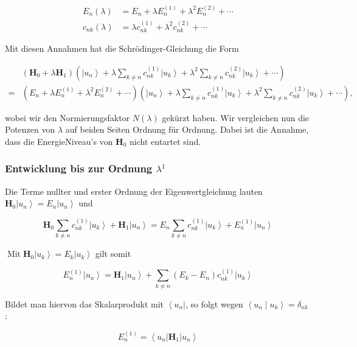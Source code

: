 \documentclass[10pt, letterpaper]{article}
\begin{document}
$$
\begin{aligned}
E_{n}(\lambda) & =E_{n}+\lambda E_{n}^{(1)}+\lambda^{2} E_{n}^{(2)}+\cdots \\
c_{n k}(\lambda) & =\lambda c_{n k}^{(1)}+\lambda^{2} c_{n k}^{(2)}+\cdots
\end{aligned}
$$

Mit diesen Annahmen hat die Schrödinger-Gleichung die Form

$$
\begin{aligned}
& \left(\mathbf{H}_{0}+\lambda \mathbf{H}_{1}\right)\left(\left|u_{n}\right\rangle+\lambda \sum_{k \neq n} c_{n k}^{(1)}\left|u_{k}\right\rangle+\lambda^{2} \sum_{k \neq n} c_{n k}^{(2)}\left|u_{k}\right\rangle+\cdots\right) \\
= & \left(E_{n}+\lambda E_{n}^{(1)}+\lambda^{2} E_{n}^{(2)}+\cdots\right)\left(\left|u_{n}\right\rangle+\lambda \sum_{k \neq n} c_{n k}^{(1)}\left|u_{k}\right\rangle+\lambda^{2} \sum_{k \neq n} c_{n k}^{(2)}\left|u_{k}\right\rangle+\cdots\right),
\end{aligned}
$$

wobei wir den Normierungsfaktor $N(\lambda)$ gekürzt haben. Wir vergleichen nun die Potenzen von $\lambda$ auf beiden Seiten Ordnung für Ordnung. Dabei ist die Annahme, dass die EnergieNiveau's von $\mathbf{H}_{0}$ nicht entartet sind.

\subsubsection*{Entwicklung bis zur Ordnung $\lambda^{1}$}
Die Terme nullter und erster Ordnung der Eigenwertgleichung lauten $\mathbf{H}_{0}\left|u_{n}\right\rangle=E_{n}\left|u_{n}\right\rangle$ und

$$
\mathbf{H}_{0} \sum_{k \neq n} c_{n k}^{(1)}\left|u_{k}\right\rangle+\mathbf{H}_{1}\left|u_{n}\right\rangle=E_{n} \sum_{k \neq n} c_{n k}^{(1)}\left|u_{k}\right\rangle+E_{n}^{(1)}\left|u_{n}\right\rangle
$$

$\operatorname{Mit} \mathbf{H}_{0}\left|u_{k}\right\rangle=E_{k}\left|u_{k}\right\rangle$ gilt somit

$$
E_{n}^{(1)}\left|u_{n}\right\rangle=\mathbf{H}_{1}\left|u_{n}\right\rangle+\sum_{k \neq n}\left(E_{k}-E_{n}\right) c_{n k}^{(1)}\left|u_{k}\right\rangle
$$

Bildet man hiervon das Skalarprodukt mit $\left\langle u_{n}\right|$, so folgt wegen $\left\langle u_{n} \mid u_{k}\right\rangle=\delta_{n k}$ :

$$
E_{n}^{(1)}=\left\langle u_{n}\right| \mathbf{H}_{1}\left|u_{n}\right\rangle
$$
\end{document}
